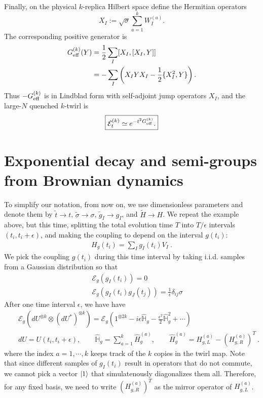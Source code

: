 \documentclass{article}
\theoremstyle{definition}
\newcommand{\nn}{\nonumber}
\newcommand{\lb}{\left(}
\newcommand{\rb}{\right)}
\newcommand{\ep}{\epsilon}
\begin{document}
Finally, on the physical $k$-replica Hilbert space define the Hermitian
operators
\begin{equation}
    X_I
    :=
    \sqrt{\sigma}
    \sum_{a=1}^kW_I^{(a)}.
\end{equation}
The corresponding positive generator is
\begin{align}
    G_{\rm eff}^{(k)}(Y)
    &=
    \frac12
    \sum_I
    [X_I,[X_I,Y]]
    \nonumber\\
    &=
    -\sum_I
    \left(
       X_IYX_I
       -
       \frac12\{X_I^2,Y\}
    \right).
    \label{eq:SYK_superoperator_G}
\end{align}
Thus $-G_{\rm eff}^{(k)}$ is in Lindblad form with self-adjoint jump
operators $X_I$, and the large-$N$ quenched $k$-twirl is
\begin{equation}
    \boxed{
    {\cal E}_t^{(k)}
    \simeq
    e^{-t^2G_{\rm eff}^{(k)}}.
    }
\end{equation}


    \section{Exponential decay and semi-groups from Brownian dynamics}

    To simplify our notation, from now on, we use dimensionless parameters and denote
    them by $\tilde{t}\to t$, $\tilde{\sigma}\to \sigma$, $\tilde{g}_{I}\to g_{I}$,
    and $\tilde{H}\to H$. We repeat the example above, but this time, splitting the
    total evolution time $T$ into $T/\epsilon$ intervals $(t_{i},t_{i}+\epsilon)$,
    and making the coupling to depend on the interval $g(t_{i})$:
    \begin{eqnarray}
        H_g(t_i)=\sum_I g_I(t_i)V_I\ .
    \end{eqnarray}
    We pick the coupling $g(t_{i})$ during this time interval by taking i.i.d.
    samples from a Gaussian distribution so that
    \begin{eqnarray}
        &&\mathcal{E}_g(g_I(t_i))=0\nn\\
        &&\mathcal{E}_g(g_I(t_i)g_J(t_j))=\frac{1}{\ep}\delta_{ij}\sigma
    \end{eqnarray}
    After one time interval $\ep$, we have have
    \begin{eqnarray}
        &&\mathcal{E}_g(dU^{\otimes k}\otimes (dU^*)^{\otimes k})=\mathcal{E}_g\lb
        1^{\otimes 2k}-i\ep \hat{\mathbb{H}}_g-\frac{\ep^{2}}{2}\hat{\mathbb{H}}_g^2+\cdots\rb
        \nn\\
        &&dU=U(t_i,t_i+\ep),\qquad \hat{\mathbb{H}}_g=\sum_{a=1}^k \hat{H}_g^{(a)},\qquad\hat{H}_g^{(a)}=H_{g,L}^{(a)}-(H_{g,R}^{(a)})^T\nn\ .
    \end{eqnarray}
    where the index $a=1,\cdots , k$ keeps track of the $k$ copies in the twirl map.
    Note that since different samples of $g_{I}(t_{i})$ result in operators that
    do not commute, we cannot pick a vector $\ket{1}$ that simulatenously diagonalizes
    them all. Therefore, for any fixed basis, we need to write
    $(H_{g,R}^{(a)})^{T}$ as the mirror operator of $H_{g,L}^{(a)}$.
\end{document}
